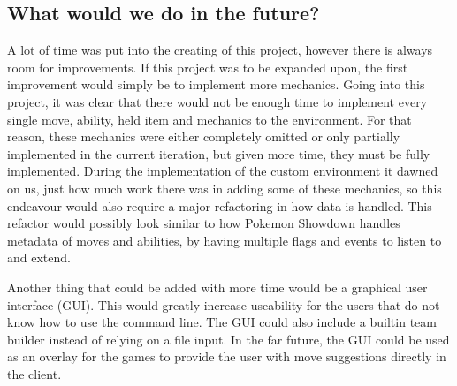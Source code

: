 \subsection{What would we do in the future?}
A lot of time was put into the creating of this project, however there is always room for improvements. If this project was to
be expanded upon, the first improvement would simply be to implement more mechanics. Going into this project, it was clear
that there would not be enough time to implement every single move, ability, held item and mechanics to the environment. 
For that reason, these mechanics were either completely omitted or only partially implemented in the current iteration, but
given more time, they must be fully implemented. During the implementation of the custom environment it dawned on us, just 
how much work there was in adding some of these mechanics, so this endeavour would also require a major refactoring in how
data is handled. This refactor would possibly look similar to how Pokemon Showdown \cite{PokemonShowdownSource} handles 
metadata of moves and abilities, by having multiple flags and events to listen to and extend.

Another thing that could be added with more time would be a graphical user interface (GUI). This would greatly increase 
useability for the users that do not know how to use the command line. The GUI could also include a builtin team builder 
instead of relying on a file input. In the far future, the GUI could be used as an overlay for the games to provide the 
user with move suggestions directly in the client.
